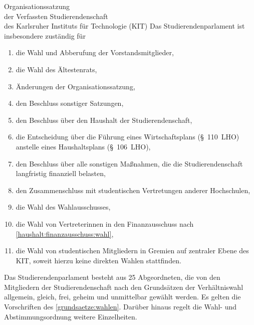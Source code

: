 \begin{jurdoc}[Organisationssatzung]{Organisationssatzung\\der Verfassten Studierendenschaft\\des Karlsruher Instituts für Technologie (KIT)}
Das Studierendenparlament ist insbesondere zuständig für
\begin{enumerate}
\item die Wahl und Abberufung der Vorstandsmitglieder,
\item die Wahl des Ältestenrats,
\item Änderungen der Organisationssatzung,
\item den Beschluss sonstiger Satzungen,
\item den Beschluss über den Haushalt der Studierendenschaft,
\item die Entscheidung über die Führung eines Wirtschaftsplans (§~110~LHO) anstelle eines Haushaltsplans (§~106~LHO),
\item den Beschluss über alle sonstigen Maßnahmen, die die Studierendenschaft langfristig finanziell belasten,
\item den Zusammenschluss mit studentischen Vertretungen anderer Hochschulen,
\item die Wahl des Wahlausschusses,
\item die Wahl von Vertreterinnen in den Finanzausschuss nach \ref{haushalt:finanzausschuss:wahl},
\item die Wahl von studentischen Mitgliedern in Gremien auf zentraler Ebene des KIT, soweit hierzu keine direkten Wahlen stattfinden.
\end{enumerate}


\label{stupa:zusammensetzung}

Das Studierendenparlament besteht aus 25 Abgeordneten, die von den Mitgliedern der Studierendenschaft nach den Grundsätzen der Verhältniswahl allgemein, gleich, frei, geheim und unmittelbar gewählt werden. Es gelten die Vorschriften des \ref{grundsaetze:wahlen}. Darüber hinaus regelt die Wahl- und Abstimmungsordnung weitere Einzelheiten.


\end{jurdoc}
